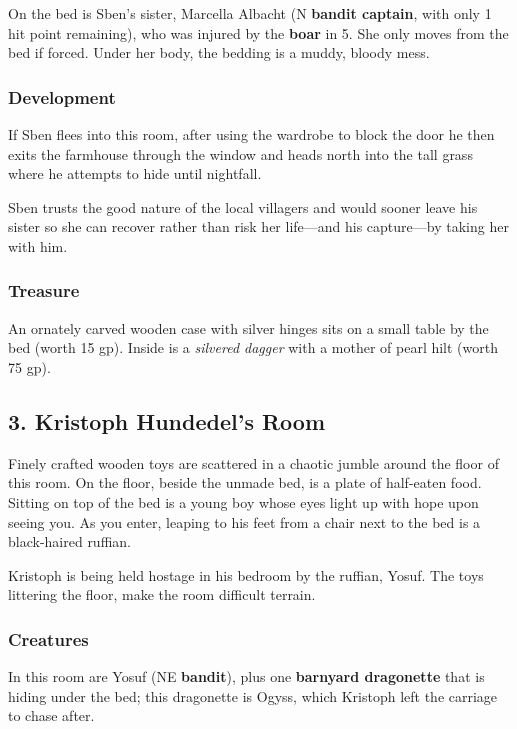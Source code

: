 \documentclass[10pt,a4paper,twoside,bg=print,twocolumn,openany,nodeprecatedcode]{dndbook}
\begin{document}
On the bed is Sben's sister, Marcella Albacht (N \textbf{bandit captain}, with only 1 hit point remaining), who was injured by the \textbf{boar} in 5. She only moves from the bed if forced. Under her body, the bedding is a muddy, bloody mess.

\subsubsection{Development}
If Sben flees into this room, after using the wardrobe to block the door he then exits the farmhouse through the window and heads north into the tall grass where he attempts to hide until nightfall.

Sben trusts the good nature of the local villagers and would sooner leave his sister so she can recover rather than risk her life—and his capture—by taking her with him.

\subsubsection{Treasure}
An ornately carved wooden case with silver hinges sits on a small table by the bed (worth 15 gp). Inside is a \textit{silvered dagger} with a mother of pearl hilt (worth 75 gp).

\subsection{3. Kristoph Hundedel's Room}
\begin{DndReadAloud}{}
Finely crafted wooden toys are scattered in a chaotic jumble around the floor of this room. On the floor, beside the unmade bed, is a plate of half-eaten food. Sitting on top of the bed is a young boy whose eyes light up with hope upon seeing you. As you enter, leaping to his feet from a chair next to the bed is a black-haired ruffian.

\end{DndReadAloud}

Kristoph is being held hostage in his bedroom by the ruffian, Yosuf. The toys littering the floor, make the room difficult terrain.

\subsubsection{Creatures}
In this room are Yosuf (NE \textbf{bandit}), plus one \textbf{barnyard dragonette} that is hiding under the bed; this dragonette is Ogyss, which Kristoph left the carriage to chase after.
\end{document}
